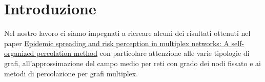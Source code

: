 \section{Introduzione}\label{sec:introduzione}
Nel nostro lavoro ci siamo impegnati a ricreare alcuni dei risultati ottenuti nel paper 
\href{https://journals.aps.org/pre/abstract/10.1103/PhysRevE.90.052817}{Epidemic spreading and risk perception in multiplex networks: A self-organized percolation method}
con particolare attenzione alle varie tipologie di grafi, all'approssimazione del campo medio per reti con grado dei nodi fissato
e ai metodi di percolazione per grafi multiplex.
